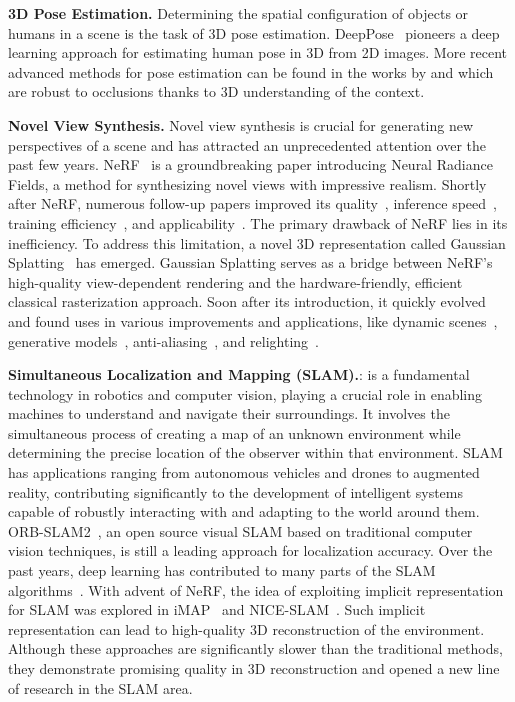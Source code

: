 \vspace{1ex}
\noindent\textbf{3D Pose Estimation.} Determining the spatial configuration of objects or humans in a scene is the task of 3D pose estimation. DeepPose~\citep{toshev2014deeppose} pioneers a deep learning approach for estimating human pose in 3D from 2D images. More recent advanced methods for pose estimation can be found in the works by \cite{zhang20233d} and \cite{zhou2023deep} which are robust to occlusions thanks to 3D understanding of the context.

\vspace{1ex}
\noindent\textbf{Novel View Synthesis.}
Novel view synthesis is crucial for generating new perspectives of a scene and has attracted an unprecedented attention over the past few years. NeRF~\citep{mildenhall2020nerf} is a groundbreaking paper introducing Neural Radiance Fields, a method for synthesizing novel views with impressive realism. Shortly after NeRF, numerous follow-up papers improved its quality~\citep{Barron_2021_ICCV, hu2023tri}, inference speed~\citep{fridovich2022plenoxels, garbin2021fastnerf}, training efficiency~\citep{sun2022direct, muller2022instant}, and applicability~\citep{meshry2019neural, park2021nerfies, chan2022efficient}. The primary drawback of NeRF lies in its inefficiency. To address this limitation, a novel 3D representation called Gaussian Splatting~\citep{kerbl20233d} has emerged. Gaussian Splatting serves as a bridge between NeRF's high-quality view-dependent rendering and the hardware-friendly, efficient classical rasterization approach. Soon after its introduction, it quickly evolved and found uses in various improvements and applications, like dynamic scenes~\citep{luiten2023dynamic,yang2023deformable}, generative models~\citep{chen2023text,tang2023dreamgaussian}, anti-aliasing~\citep{yu2023mip}, and relighting~\citep{gao2023relightable}.

\vspace{1ex}
\noindent\textbf{Simultaneous Localization and Mapping (SLAM).}:  is a fundamental technology in robotics and computer vision, playing a crucial role in enabling machines to understand and navigate their surroundings. It involves the simultaneous process of creating a map of an unknown environment while determining the precise location of the observer within that environment. SLAM has applications ranging from autonomous vehicles and drones to augmented reality, contributing significantly to the development of intelligent systems capable of robustly interacting with and adapting to the world around them. ORB-SLAM2~\citep{mur2017orb}, an open source visual SLAM based on traditional computer vision techniques, is still a leading approach for localization accuracy. Over the past years, deep learning has contributed to many parts of the SLAM algorithms~\citep{mokssit2023deep}. With advent of NeRF, the idea of exploiting implicit representation for SLAM was explored in iMAP~\citep{sucar2021imap} and NICE-SLAM~\citep{zhu2022nice}. Such implicit representation can lead to high-quality 3D reconstruction of the environment. Although these approaches are significantly slower than the traditional methods, they demonstrate promising quality in 3D reconstruction and opened a new line of research in the SLAM area.

